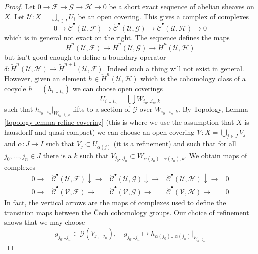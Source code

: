 \begin{proof}
\medskip\noindent
Let $0 \to \mathcal{F} \to \mathcal{G} \to \mathcal{H} \to 0$
be a short exact sequence of abelian sheaves on $X$.
Let $\mathcal{U} : X = \bigcup_{i \in I} U_i$ be an open covering.
This gives a complex of complexes
$$
0 \to \check{\mathcal{C}}^\bullet(\mathcal{U}, \mathcal{F}) \to
\check{\mathcal{C}}^\bullet(\mathcal{U}, \mathcal{G}) \to
\check{\mathcal{C}}^\bullet(\mathcal{U}, \mathcal{H}) \to 0
$$
which is in general not exact on the right. The sequence defines
the maps
$$
\check{H}^n(\mathcal{U}, \mathcal{F}) \to
\check{H}^n(\mathcal{U}, \mathcal{G}) \to
\check{H}^n(\mathcal{U}, \mathcal{H})
$$
but isn't good enough to define a boundary operator
$\delta : \check{H}^n(\mathcal{U}, \mathcal{H}) \to
\check{H}^{n + 1}(\mathcal{U}, \mathcal{F})$. Indeed
such a thing will not exist in general. However, given an
element $\overline{h} \in \check{H}^n(\mathcal{U}, \mathcal{H})$
which is the cohomology class of a cocycle
$h = (h_{i_0 \ldots i_n})$
we can choose open coverings
$$
U_{i_0 \ldots i_n} = \bigcup W_{i_0 \ldots i_n, k}
$$
such that $h_{i_0 \ldots i_n}|_{W_{i_0 \ldots i_n, k}}$
lifts to a section of $\mathcal{G}$ over $W_{i_0 \ldots i_n, k}$.
By Topology, Lemma \ref{topology-lemma-refine-covering}
(this is where we use the assumption that $X$ is hausdorff and quasi-compact)
we can choose an open covering $\mathcal{V} : X = \bigcup_{j \in J} V_j$
and $\alpha : J \to I$ such that $V_j \subset U_{\alpha(j)}$
(it is a refinement) and such that for all $j_0, \ldots, j_n \in J$
there is a $k$ such that
$V_{j_0 \ldots j_n} \subset W_{\alpha(j_0) \ldots \alpha(j_n), k}$.
We obtain maps of complexes
$$
\begin{array}{ccccc}0 \longrightarrow & \check{\mathcal{C}}^\bullet(\mathcal{U}, \mathcal{F}) \downarrow\longrightarrow & \check{\mathcal{C}}^\bullet(\mathcal{U}, \mathcal{G}) \downarrow\longrightarrow & \check{\mathcal{C}}^\bullet(\mathcal{U}, \mathcal{H}) \downarrow\longrightarrow & 0 \\ 0 \longrightarrow & \check{\mathcal{C}}^\bullet(\mathcal{V}, \mathcal{F}) \longrightarrow & \check{\mathcal{C}}^\bullet(\mathcal{V}, \mathcal{G}) \longrightarrow & \check{\mathcal{C}}^\bullet(\mathcal{V}, \mathcal{H}) \longrightarrow & 0\end{array}
$$
In fact, the vertical arrows are the maps of complexes used
to define the transition maps between the {\v C}ech cohomology groups.
Our choice of refinement shows that we may choose
$$
g_{j_0 \ldots j_n} \in
\mathcal{G}(V_{j_0 \ldots j_n}),\quad
g_{j_0 \ldots j_n} \longmapsto
h_{\alpha(j_0) \ldots \alpha(j_n)}|_{V_{j_0 \ldots j_n}}
$$
\end{proof}
